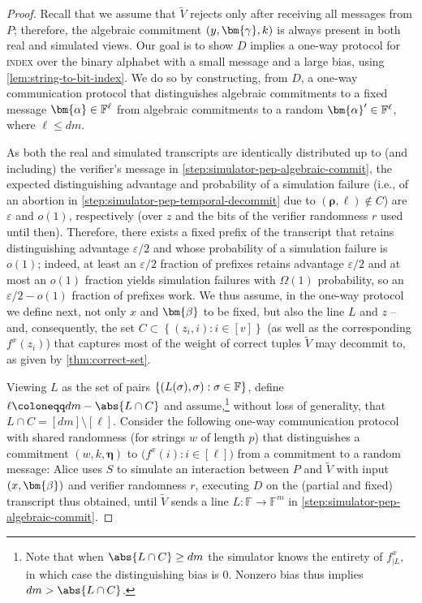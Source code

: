 \documentclass[a4paper,UKenglish,cleveref, autoref, thm-restate]{lipics-v2021}
\theoremstyle{definition}
\newcommand{\field}{\mathbb{F}}
\renewcommand{\set}[1]{\left\{#1\right\}}
\newcommand{\eps}{\varepsilon}
\newcommand{\indexproblem}{\normalfont\textsc{index}\xspace}
\newcommand{\vcommitlength}{v}
\newcommand{\vcommitstring}{z}
\newcommand{\pcommitlength}{p}
\newcommand{\pcommitstring}{y}
\newcommand{\dimension}{m}
\newcommand{\degree}{d}
\newcommand{\evaluationpoint}{\bm{\fe2}}
\newcommand{\fingerprinttuple}{\bm{\rho}}
\renewcommand{\line}{L}
\def\fe#1{
    \ifnum#1=1
        \alpha
    \else
    \ifnum#1=2
        \beta
    \else
    \ifnum#1=3
        \gamma
    \fi\fi\fi
}
\def\rfe#1{
    \ifnum#1=1
        \rho
    \else
    \ifnum#1=2
        \sigma
    \else
    \fi\fi
}
\begin{document}
\begin{proof}
    Recall that we assume that $\widetilde V$ rejects only after receiving all messages from $P$; therefore, the algebraic commitment $(\pcommitstring, \bm{\fe3}, k)$ is always present in both real and simulated views. Our goal is to show $D$ implies a one-way protocol for \indexproblem over the binary alphabet with a small message and a large bias, using \cref{lem:string-to-bit-index}. We do so by constructing, from $D$, a one-way communication protocol that distinguishes algebraic commitments to a fixed message $\bm{\fe1} \in \field^\ell$ from algebraic commitments to a random $\bm{\fe1}' \in \field^\ell$, where $\ell \leq \degree \dimension$.
    
    As both the real and simulated transcripts are identically distributed up to (and including) the verifier's message in \cref{step:simulator-pep-algebraic-commit}, the expected distinguishing advantage and probability of a simulation failure (i.e., of an abortion in \cref{step:simulator-pep-temporal-decommit} due to $(\fingerprinttuple, \ell) \notin C$) are $\eps$ and $o(1)$, respectively (over $\vcommitstring$ and the bits of the verifier randomness $r$ used until then). Therefore, there exists a fixed prefix of the transcript that retains distinguishing advantage $\eps/2$ and whose probability of a simulation failure is $o(1)$; indeed, at least an $\eps/2$ fraction of prefixes retains advantage $\eps/2$ and at most an $o(1)$ fraction yields simulation failures with $\Omega(1)$ probability, so an $\eps/2 - o(1)$ fraction of prefixes work. We thus assume, in the one-way protocol we define next, not only $x$ and $\evaluationpoint$ to be fixed, but also the line $\line$ and $\vcommitstring$ -- and, consequently, the set $C \subset \set{(\vcommitstring_i, i) : i \in [\vcommitlength]}$ (as well as the corresponding $f^x(\vcommitstring_i)$) that captures most of the weight of correct tuples $\widetilde V$ may decommit to, as given by \cref{thm:correct-set}.

    Viewing $\line$ as the set of pairs $\set{(\line(\rfe2), \rfe2) : \rfe2 \in \field}$, define $\ell \coloneqq \degree\dimension - \abs{\line \cap C}$ and assume,\footnote{Note that when $\abs{\line \cap C} \geq \degree\dimension$ the simulator knows the entirety of $f^x_{|\line}$, in which case the distinguishing bias is $0$. Nonzero bias thus implies $\degree\dimension > \abs{\line \cap C}$.} without loss of generality, that $\line \cap C = [\degree\dimension] \setminus [\ell]$.
    Consider the following one-way communication protocol with shared randomness (for strings $w$ of length $\pcommitlength$) that distinguishes a commitment $(w, k, \bm{\eta})$ to $\big(f^x(i) : i \in [\ell]\big)$ from a commitment to a random message: Alice uses $S$ to simulate an interaction between $P$ and $\widetilde V$ with input $(x, \evaluationpoint)$ and verifier randomness $r$, executing $D$ on the (partial and fixed) transcript thus obtained, until $\widetilde V$ sends a line $\line: \field \to \field^\dimension$ in \cref{step:simulator-pep-algebraic-commit}.
    

\end{proof}
\end{document}
